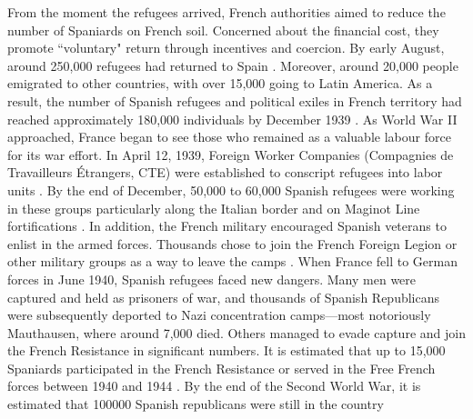 From the moment the refugees arrived, French authorities aimed to reduce the number of Spaniards on French soil. Concerned about the financial cost, they  promote ``voluntary" return through incentives and coercion. By early August, around 250,000 refugees had returned to Spain \citep{perez_rodriguez_indeseables_2022}. Moreover, around 20,000 people emigrated to other countries, with over 15,000 going to Latin America. As a result, the number of Spanish refugees and political exiles in French territory had reached approximately 180,000 individuals by December 1939 \citep{rafaneau20081939}. As World War II approached, France began to see those who remained as a valuable labour force for its war effort. In April 12, 1939, Foreign Worker Companies (Compagnies de Travailleurs Étrangers, CTE) were established to conscript refugees into labor units \citep{Coignard2012}. By the end of December, 50,000 to 60,000 Spanish refugees were working in these groups particularly along the Italian border and on Maginot Line fortifications \citep{rafaneau20081939}. In addition, the French military encouraged Spanish veterans to enlist in the armed forces. Thousands chose to join the French Foreign Legion or other military groups as a way to leave the camps \citep{perez_rodriguez_indeseables_2022}. When France fell to German forces in June 1940, Spanish refugees faced new dangers. Many men were captured and held as prisoners of war, and thousands of Spanish Republicans were subsequently deported to Nazi concentration camps—most notoriously Mauthausen, where around 7,000 died. Others managed to evade capture and join the French Resistance in significant numbers. It is estimated that up to 15,000 Spaniards participated in the French Resistance or served in the Free French forces between 1940 and 1944 \citep{academicoup}. By the end of the Second World War, it is estimated that 100000 Spanish republicans were still in the country \citep{perez_rodriguez_indeseables_2022}













